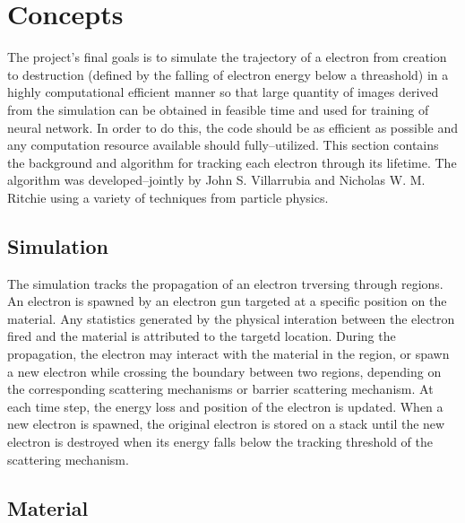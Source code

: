 \chapter{Concepts}
\label{sec:concepts}
The project's final goals is to simulate the trajectory of a electron from creation to destruction (defined by the falling of electron energy below a threashold) in a highly computational efficient manner so that large quantity of images derived from the simulation can be obtained in feasible time and used for training of neural network. In order to do this, the code should be as efficient as possible and any computation resource available should fully--utilized. This section contains the background and algorithm for tracking each electron through its lifetime. The algorithm was developed--jointly by John S.  Villarrubia and Nicholas W. M. Ritchie using a variety of techniques from particle physics.

\section{Simulation}\label{sec:concept_monte_carlo_ss}

The simulation tracks the propagation of an electron trversing through regions. An electron is spawned by an electron gun targeted at a specific position on the material. Any statistics generated by the physical interation between the electron fired and the material is attributed to the targetd location. During the propagation, the electron may interact with the material in the region, or spawn a new electron while crossing the boundary between two regions, depending on the corresponding scattering mechanisms or barrier scattering mechanism. At each time step, the energy loss and position of the electron is updated. When a new electron is spawned, the original electron is stored on a stack until the new electron is destroyed when its energy falls below the tracking threshold of the scattering mechanism.

\section{Material}\label{sec:concept_material}

